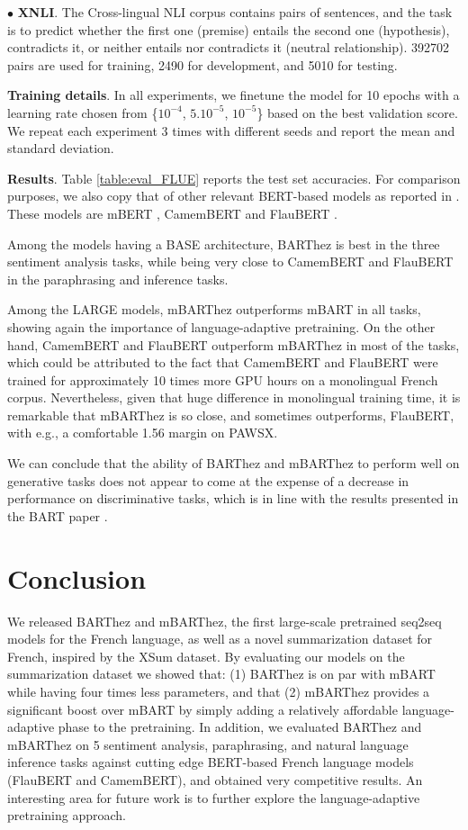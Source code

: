 \documentclass[11pt,a4paper]{article}
\begin{document}
\noindent $\bullet$ \textbf{XNLI}. The Cross-lingual NLI corpus \cite{conneau2018xnli} contains pairs of sentences, and the task is to predict whether the first one (premise) entails the second one (hypothesis), contradicts it, or neither entails nor contradicts it (neutral relationship). 392702 pairs are used for training, 2490 for development, and 5010 for testing.

\noindent\textbf{Training details}. In all experiments, we finetune the model for 10 epochs with a learning rate chosen from  \{$10^{-4}$, $5.10^{-5}$, $10^{-5}$\} based on the best validation score.
We repeat each experiment 3 times with different seeds and report the mean and standard deviation.

\noindent\textbf{Results}. Table \ref{table:eval_FLUE} reports the test set accuracies.
For comparison purposes, we also copy that of other relevant BERT-based models as reported in \citet{le2019flaubert}.
These models are mBERT \cite{devlin2018bert}, CamemBERT \cite{martin2019camembert} and FlauBERT \cite{le2019flaubert}.

Among the models having a BASE architecture, BARThez is best in the three sentiment analysis tasks, while being very close to CamemBERT and FlauBERT in the paraphrasing and inference tasks.

Among the LARGE models, mBARThez outperforms mBART in all tasks, showing again the importance of language-adaptive pretraining.
On the other hand, CamemBERT and FlauBERT outperform mBARThez in most of the tasks, which could be attributed to the fact that CamemBERT and FlauBERT were trained for approximately 10 times more GPU hours on a monolingual French corpus.
Nevertheless, given that huge difference in monolingual training time, it is remarkable that mBARThez is so close, and sometimes outperforms, FlauBERT, with e.g., a comfortable 1.56 margin on PAWSX.

We can conclude that the ability of BARThez and mBARThez to perform well on generative tasks does not appear to come at the expense of a decrease in performance on discriminative tasks, which is in line with the results presented in the BART paper \cite{lewis2019bart}.

\section{Conclusion}
We released BARThez and mBARThez, the first large-scale pretrained seq2seq models for the French language, as well as a novel summarization dataset for French, inspired by the XSum dataset.
By evaluating our models on the summarization dataset we showed that:
(1) BARThez is on par with mBART while having four times less parameters, and that (2) mBARThez provides a significant boost over mBART by simply adding a relatively affordable language-adaptive phase to the pretraining.
In addition, we evaluated BARThez and mBARThez on 5 sentiment analysis, paraphrasing, and natural language inference tasks against cutting edge BERT-based French language models (FlauBERT and CamemBERT), and obtained very competitive results.
An interesting area for future work is to further explore the language-adaptive pretraining approach.
\end{document}
